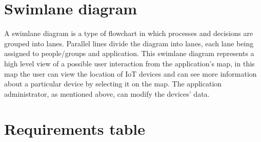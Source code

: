 \documentclass{scrreprt}
\begin{document}
\section{Swimlane diagram}

A swimlane diagram is a type of flowchart in which processes and decisions
are grouped into lanes. Parallel lines divide the diagram into lanes, each
lane being assigned to people/groups and application.
This swimlane diagram represents a high level view of a possible user interaction
from the application's map, in this map the user can view the location of
IoT devices and can see more information about a particular device by selecting
it on the map. The application administrator, as mentioned above, can modify the
devices' data.

\section{Requirements table}
\end{document}
